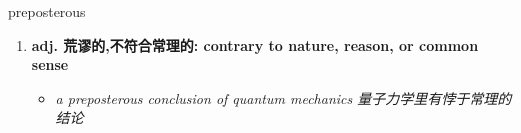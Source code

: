 
\begin{frame}
{\huge preposterous}
\begin{center}
\begin{enumerate}\Large
  \item \textbf{adj. 荒谬的,不符合常理的: contrary to nature, reason, or common sense}
  \begin{itemize}
    \item \em{\Large{a preposterous conclusion of quantum mechanics 量子力学里有悖于常理的结论}}
  \end{itemize}
\end{enumerate}
\end{center}
\end{frame}
